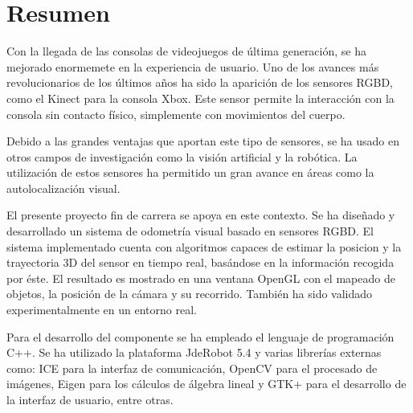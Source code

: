 \chapter*{Resumen}

Con la llegada de las consolas de videojuegos de última generación, se ha mejorado enormemete en la experiencia de usuario. Uno de los avances más revolucionarios de los últimos años ha sido la aparición de los sensores RGBD, como el Kinect para la consola Xbox. Este sensor permite la interacción con la consola sin contacto físico, simplemente con movimientos del cuerpo.

Debido a las grandes ventajas que aportan este tipo de sensores, se ha usado en otros campos de investigación como la visión artificial y la robótica. La utilización de estos sensores ha permitido un gran avance en áreas como la autolocalización visual.

El presente proyecto fin de carrera se apoya en este contexto. Se ha diseñado y desarrollado un sistema de odometría visual basado en sensores RGBD. El sistema implementado cuenta con algoritmos capaces de estimar la posicion y la trayectoria 3D del sensor en tiempo real, basándose en la información recogida por éste. El resultado es mostrado en una ventana OpenGL con el mapeado de objetos, la posición de la cámara y su recorrido. También ha sido validado experimentalmente en un entorno real.

Para el desarrollo del componente se ha empleado el lenguaje de programación C++. Se ha utilizado la plataforma JdeRobot 5.4 y varias librerías externas como: ICE para la interfaz de comunicación, OpenCV para el procesado de imágenes, Eigen para los cálculos de álgebra lineal y GTK+ para el desarrollo de la interfaz de usuario, entre otras.